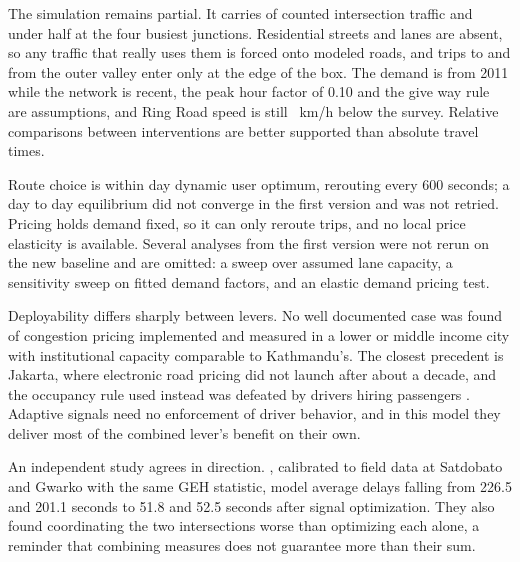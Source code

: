 The simulation remains partial. It carries \ValShare{} of counted intersection traffic and under
half at the four busiest junctions. Residential streets and lanes are absent, so any traffic that
really uses them is forced onto modeled roads, and trips to and from the outer valley enter only at
the edge of the box. The demand is from 2011 while the network is recent, the peak hour factor of
0.10 and the give way rule are assumptions, and Ring Road speed is still \ValRingGap~km/h below the
survey. Relative comparisons between interventions are better supported than absolute travel
times.

Route choice is within day dynamic user optimum, rerouting every 600 seconds; a day to day
equilibrium did not converge in the first version and was not retried. Pricing holds demand fixed,
so it can only reroute trips, and no local price elasticity is available. Several analyses from the
first version were not rerun on the new baseline and are omitted: a sweep over assumed lane
capacity, a sensitivity sweep on fitted demand factors, and an elastic demand pricing test.

Deployability differs sharply between levers. No well documented case was found of congestion
pricing implemented and measured in a lower or middle income city with institutional capacity
comparable to Kathmandu's. The closest precedent is Jakarta, where electronic road pricing did not
launch after about a decade, and the occupancy rule used instead was defeated by drivers hiring
passengers \citep{jakartapost2013}. Adaptive signals need no enforcement of driver behavior, and in
this model they deliver most of the combined lever's benefit on their own.

An independent study agrees in direction. \citet{tiwari2024satdobato}, calibrated to field data at
Satdobato and Gwarko with the same GEH statistic, model average delays falling from 226.5 and 201.1
seconds to 51.8 and 52.5 seconds after signal optimization. They also found coordinating the two
intersections worse than optimizing each alone, a reminder that combining measures does not
guarantee more than their sum.
